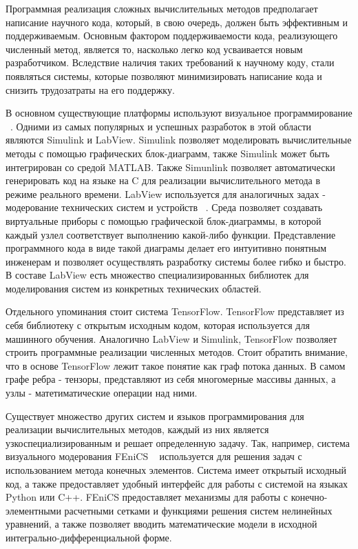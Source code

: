 Программная реализация сложных вычислительных методов предполагает написание научного кода, который, в свою очередь, должен быть эффективным и поддерживаемым. Основным фактором поддерживаемости кода, реализующего численный метод, является то, насколько легко код усваивается новым разработчиком. Вследствие наличия таких требований к научному коду, стали появляться системы, которые позволяют минимизировать написание кода и снизить трудозатраты на его поддержку.

В основном существующие платформы используют визуальное программирование ~\cite{CSEComputationalSteering}. Одними из самых популярных и успешных разработок в этой области являются Simulink и LabView. Simulink позволяет моделировать вычислительные методы с помощью графических блок-диаграмм, также Simulink может быть интегрирован со средой MATLAB. Также Simunlink позволяет автоматически генерировать код на языке на C для реализации вычислительного метода в режиме реального времени. LabView используется для аналогичных задах - модерование технических систем и устройств ~\cite{LabViewUsage}. Среда позволяет создавать виртуальные приборы с помощью графической блок-диаграммы, в которой каждый узлел соответствует выполнению какой-либо функции. Представление программного кода в виде такой диаграмы делает его интуитивно понятным инженерам и позволяет осуществлять разработку системы более гибко и быстро. В составе LabView есть множество специализированных библиотек для моделирования систем из конкретных технических областей.

Отдельного упоминания стоит система TensorFlow. TensorFlow представляет из себя библиотеку с открытым исходным кодом, которая используется для машинного обучения. Аналогично LabView и Simulink, TensorFlow позволяет строить программные реализации численных методов. Стоит обратить внимание, что в основе TensorFlow лежит такое понятие как граф потока данных. В самом графе ребра - тензоры, представляют из себя многомерные массивы данных, а узлы - матетиматические операции над ними.

Существует множество других систем и языков программирования для реализации вычислительных методов, каждый из них является узкоспециализированным и решает определенную задачу. Так, например, система визуального модерования FEniCS ~\cite{FEniCSFramework} используется для решения задач с использованием метода конечных элементов. Система имеет открытый исходный код, а также предоставляет удобный интерфейс для работы с системой на языках Python или C++. FEniCS предоставляет механизмы для работы с конечно-элементными расчетными сетками и функциями решения систем нелинейных уравнений, а также позволяет вводить математические модели в исходной интегрально-дифференциальной форме.


